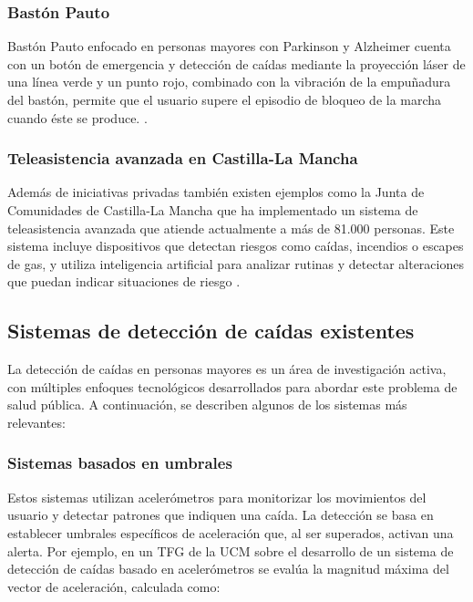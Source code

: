 \documentclass[12pt, a4paper]{article}
\begin{document}
	\subsubsection{Bastón Pauto}
	
	Bastón Pauto enfocado en personas mayores con Parkinson y Alzheimer cuenta con un botón de emergencia y detección de caídas mediante la proyección láser de una línea verde y un punto rojo, combinado con la vibración de la empuñadura del bastón, permite que el usuario supere el episodio de bloqueo de la marcha cuando éste se produce. \cite{Pauto2019}.
	
	\subsubsection{Teleasistencia avanzada en Castilla-La Mancha}
	
	Además de iniciativas privadas también existen ejemplos como la Junta de Comunidades de Castilla-La Mancha que ha implementado un sistema de teleasistencia avanzada que atiende actualmente a más de 81.000 personas. Este sistema incluye dispositivos que detectan riesgos como caídas, incendios o escapes de gas, y utiliza inteligencia artificial para analizar rutinas y detectar alteraciones que puedan indicar situaciones de riesgo \cite{castillalamancha2025}.
	


	\subsection{Sistemas de detección de caídas existentes}


	La detección de caídas en personas mayores es un área de investigación activa, con múltiples enfoques tecnológicos desarrollados para abordar este problema de salud pública. A continuación, se describen algunos de los sistemas más relevantes:
		
	\subsubsection{Sistemas basados en umbrales}

	
	Estos sistemas utilizan acelerómetros para monitorizar los movimientos del usuario y detectar patrones que indiquen una caída. La detección se basa en establecer umbrales específicos de aceleración que, al ser superados, activan una alerta. Por ejemplo, en un TFG de la UCM sobre el desarrollo de un sistema de detección de caídas basado en acelerómetros se evalúa la magnitud máxima del vector de aceleración, calculada como:
	
\end{document}
